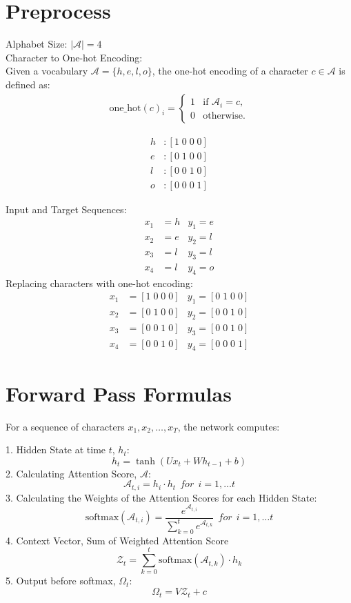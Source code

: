 \documentclass{article}
\begin{document}
\section{Preprocess}
Alphabet Size: $|\mathcal{A}| = 4$  \\
Character to One-hot Encoding: \\
Given a vocabulary $\mathcal{A} = \{h, e, l, o\}$, the one-hot encoding of a character $c \in \mathcal{A}$ is defined as:
\begin{align*}
\text{one\_hot}(c)_i = 
\begin{cases} 
1 & \text{if } \mathcal{A}_i = c, \\
0 & \text{otherwise}.
\end{cases}
\end{align*}

\begin{align*}
    h & : [1\; 0\; 0\; 0] \\
    e & : [0\; 1\; 0\; 0] \\
    l & : [0\; 0\; 1\; 0] \\
    o & : [0\; 0\; 0\; 1]
\end{align*}

Input and Target Sequences:
\begin{align*}
    x_1 & = h  &y_1 = e \\
    x_2 & = e  &y_2 = l \\
    x_3& = l  &y_3 = l \\
    x_4 & = l  &y_4 = o
\end{align*}
Replacing characters with one-hot encoding:
\begin{align*}
    x_1 & = [1\; 0\; 0\; 0]  &y_1 = [0\; 1\; 0\; 0] \\
    x_2 & = [0\; 1\; 0\; 0]  &y_2 = [0\; 0\; 1\; 0] \\
    x_3& = [0\; 0\; 1\; 0]  &y_3 = [0\; 0\; 1\; 0] \\
    x_4 & = [0\; 0\; 1\; 0]  &y_4 = [0\; 0\; 0\; 1]
\end{align*}

\section{Forward Pass Formulas}

For a sequence of characters $x_1, x_2, \ldots, x_T$, the network computes:

1. Hidden State at time $t$, $h_t$:
$$
h_t = \tanh(Ux_t + Wh_{t-1} + b)
$$
2. Calculating Attention Score, $\mathcal{A}$:
$$
\mathcal{A}_{t,i} = h_i  \cdot h_t~~for~~ i =1, \ldots t
$$
3. Calculating the Weights of the Attention Scores for each Hidden State:
$$\text{softmax}(\mathcal{A}_{t,i}) = \frac{e^{\mathcal{A}_{t,i }}}{\sum_{k=0}^{t} e^{\mathcal{A}_{t,k}}} ~~for~~ i =1, \ldots t$$
4. Context Vector, Sum of Weighted Attention Score
$$\mathcal{Z}_t = \sum_{k=0}^{t}  \text{softmax}(\mathcal{A}_{t,k}) \cdot h_k$$
5. Output before softmax, $\Omega_t$:
$$
\Omega_t = V\mathcal{Z}_t + c
$$
\end{document}
